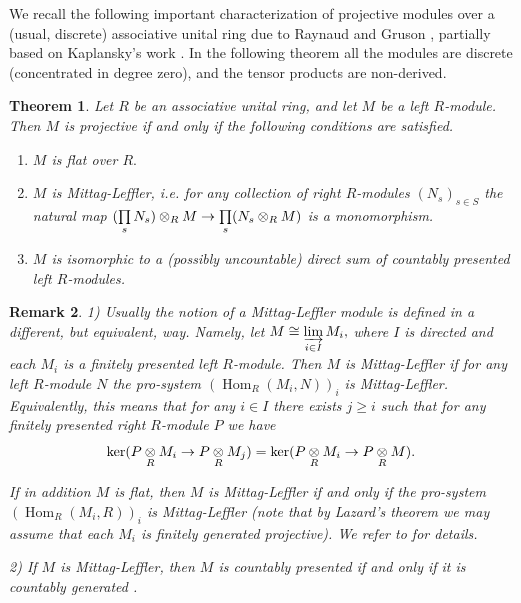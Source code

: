 \documentclass[11pt,leqno]{amsart}
\newtheorem{theo}{Theorem}[section]
\newtheorem{remark}[theo]{Remark}
\numberwithin{equation}{section}
\def\Hom{\operatorname{Hom}}
\newcommand{\tens}[1]{%
  \mathbin{\mathop{\otimes}\displaylimits_{#1}}%
}
\newcommand{\indlim}[1][]{\mathop{\varinjlim}\limits_{#1}}
\newcommand{\prodd}[1][]{\mathop{\prod}\limits_{#1}}
\begin{document}
We recall the following important characterization of projective modules over a (usual, discrete) associative unital ring due to Raynaud and Gruson \cite{RayGru}, partially based on Kaplansky's work \cite{Ka58}. In the following theorem all the modules are discrete (concentrated in degree zero), and the tensor products are non-derived.

\begin{theo}\cite{Ka58, RayGru}\cite[\href{https://stacks.math.columbia.edu/tag/059Z}{Tag 059Z}]{Stacks}\label{th:Raynaud_Gruson}
Let $R$ be an associative unital ring, and let $M$ be a left $R$-module. Then $M$ is projective if and only if the following conditions are satisfied.
\begin{enumerate}[label=(\roman*),ref=(\roman*)]
\item $M$ is flat over $R.$ \label{cond_flat_module}
\item $M$ is Mittag-Leffler, i.e. for any collection of right $R$-modules $(N_s)_{s\in S}$ the natural map $(\prodd[s]N_s)\tens{R}M\to \prodd[s](N_s\tens{R}M)$ is a monomorphism. \label{cond_ML_module}
\item $M$ is isomorphic to a (possibly uncountable) direct sum of countably presented left $R$-modules. \label{cond_coproduct_of_countably presented}
\end{enumerate} 
\end{theo}

\begin{remark} 1) Usually the notion of a Mittag-Leffler module is defined in a different, but equivalent, way. Namely, let $M\cong \indlim[i\in I]M_i,$ where $I$ is directed and each $M_i$ is a finitely presented left $R$-module. Then $M$ is Mittag-Leffler if for any left $R$-module $N$ the pro-system $(\Hom_R(M_i,N))_i$ is Mittag-Leffler. Equivalently, this means that for any $i\in I$ there exists $j\geq i$ such that for any finitely presented right $R$-module $P$
we have
\begin{equation*}
\ker(P\tens{R}M_i\to P\tens{R}M_j)=\ker(P\tens{R}M_i\to P\tens{R}M).
\end{equation*}

If in addition $M$ is flat, then $M$ is Mittag-Leffler if and only if the pro-system $(\Hom_R(M_i,R))_i$ is Mittag-Leffler (note that by Lazard's theorem we may assume that each $M_i$ is finitely generated projective). We refer to \cite[\href{https://stacks.math.columbia.edu/tag/0599}{Tag 0599}, \href{https://stacks.math.columbia.edu/tag/059M}{Tag 059M}]{Stacks} for details.

2) If $M$ is Mittag-Leffler, then $M$ is countably presented if and only if it is countably generated \cite[\href{https://stacks.math.columbia.edu/tag/059W}{Tag 059W}]{Stacks}. 
\end{remark}
\end{document}
